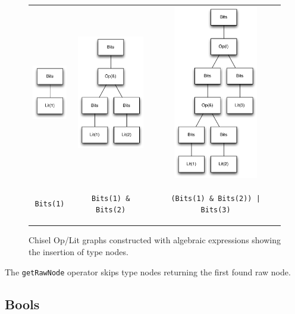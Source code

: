 \documentclass[10pt,twocolumn]{article}
\newcommand{\kode}[1]{\begin{footnotesize}{\tt #1}\end{footnotesize}}
\def\code#1{{\small\tt #1}}
\begin{document}
\begin{figure}
\begin{center}
\begin{tabular}{ccc}
\includegraphics[height=0.94in]{figs/bits-1.pdf} &
\includegraphics[height=1.96in]{figs/bits-and.pdf} &
\includegraphics[height=3.0in]{figs/bits-or-and.pdf} \\
\kode{Bits(1)} & \kode{Bits(1) \& Bits(2)} &
\kode{(Bits(1) \& Bits(2)) | Bits(3)} \\
\end{tabular}
\end{center}
\caption{Chisel Op/Lit graphs constructed with algebraic expressions
  showing the insertion of type nodes.}
\label{fig:bits-expressions}
\end{figure}

\noindent
The \code{getRawNode} operator skips type nodes returning the first
found raw node.

\subsection{Bools}
\end{document}
